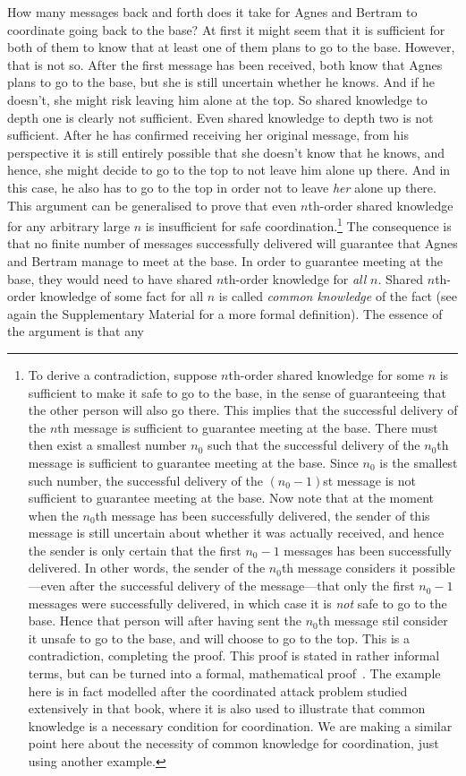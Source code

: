 \documentclass[twocolumn,a4paper,superscriptaddress,nofootinbib]{revtex4}
\begin{document}
How many messages back and forth does it take for Agnes and Bertram to coordinate going back to the base? At first it might seem that it is sufficient for both of them to know that at least one of them plans to go to the base. However, that is not so. After the first message has been received, both know that Agnes plans to go to the base, but she is still uncertain whether he knows. And if he doesn't, she might risk leaving him alone at the top. So shared knowledge to depth one is clearly not sufficient. Even shared knowledge to depth two is not sufficient. After he has confirmed receiving her original message, from his perspective it is still entirely possible that she doesn't know that he knows, and hence, she might decide to go to the top to not leave him alone up there. And in this case, he also has to go to the top in order not to leave \emph{her} alone up there. This argument can be generalised to prove that even $n$th-order shared knowledge for any arbitrary large $n$ is insufficient for safe coordination.\footnote{To derive a contradiction, suppose $n$th-order shared knowledge for some $n$ is sufficient to make it safe to go to the base, in the sense of guaranteeing that the other person will also go there. This implies that the successful delivery of the $n$th message is sufficient to guarantee meeting at the base. There must then exist a smallest number $n_0$ such that the successful delivery of the $n_0$th message is sufficient to guarantee meeting at the base. Since $n_0$ is the smallest such number, the successful delivery of the $(n_0-1)$st message is not sufficient to guarantee meeting at the base. Now note that at the moment when the $n_0$th message has been successfully delivered, the sender of this message is still uncertain about whether it was actually received, and hence the sender is only certain that the first $n_0-1$ messages has been successfully delivered.  In other words, the sender of the $n_0$th message considers it possible---even after the successful delivery of the message---that only the first $n_0-1$ messages were successfully delivered, in which case it is \emph{not} safe to go to the base. Hence that person will after having sent the $n_0$th message stil consider it unsafe to go to the base, and will choose to go to the top. This is a contradiction, completing the proof. This proof is stated in rather informal terms, but can be turned into a formal, mathematical proof~\citep{fagin1995reasoning}. The example here is in fact modelled after the coordinated attack problem studied extensively in that book, where it is also used to illustrate that common knowledge is a necessary condition for coordination. We are making a similar point here about the necessity of common knowledge for coordination, just using another example.}  The consequence is that no finite number of messages successfully delivered will guarantee that Agnes and Bertram manage to meet at the base. In order to guarantee meeting at the base, they would need to have shared $n$th-order knowledge for \emph{all} $n$. Shared $n$th-order knowledge of some fact for all $n$ is called  \emph{common knowledge} of the fact (see again the Supplementary Material for a more formal definition). The essence of the argument is that any  
\end{document}
